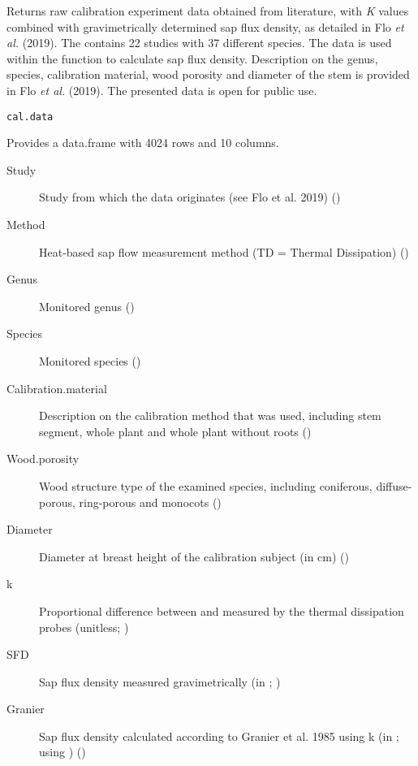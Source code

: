 \documentclass[a4paper]{book}
\begin{document}
%
\begin{Description}\relax
Returns raw calibration experiment data obtained from literature,
with \emph{K} values combined with gravimetrically determined sap flux density,
as detailed in Flo \emph{et al.} (2019).
The  contains 22 studies with 37 different species. The data is used
within the  function to calculate sap flux density.
Description on the genus, species, calibration material, wood porosity and diameter
of the stem is provided in Flo \emph{et al.} (2019).
The presented data is open for public use.
\end{Description}
%
\begin{Usage}
\begin{verbatim}
cal.data
\end{verbatim}
\end{Usage}
%
\begin{Format}
Provides a data.frame with 4024 rows and 10 columns.
\begin{description}

\item[Study] Study from which the data originates (see Flo et al. 2019) ()
\item[Method] Heat-based sap flow measurement method (TD = Thermal Dissipation) ()
\item[Genus] Monitored genus ()
\item[Species] Monitored species ()
\item[Calibration.material] Description on the calibration method that was used,
including stem segment, whole plant and whole plant without roots ()
\item[Wood.porosity] Wood structure type of the examined species, including coniferous, diffuse-porous, ring-porous and monocots ()
\item[Diameter] Diameter at breast height of the calibration subject (in cm) ()
\item[k] Proportional difference between  and  measured
by the thermal dissipation probes (unitless; )
\item[SFD] Sap flux density measured gravimetrically (in ; )
\item[Granier] Sap flux density calculated according to Granier et al. 1985 using k
(in ; using ) ()

\end{description}
\end{Format}
\end{document}
